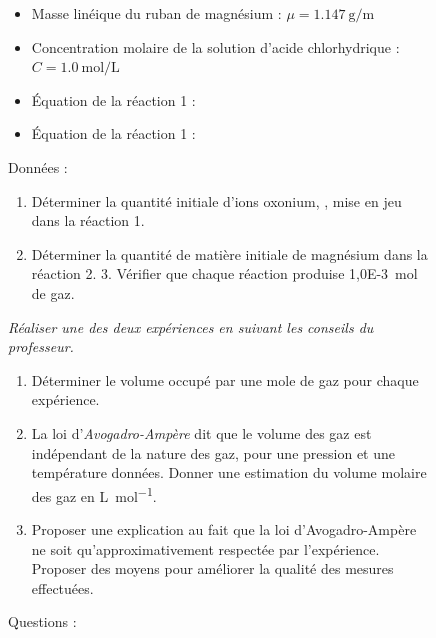 \documentclass[a4paper,12pt,fleqn]{article}%
\begin{document}
\begin{figure}[h!]
	\caption{Données :}
	\label{doc4}
	\begin{itemize}
		\item Masse linéique du ruban de magnésium : $\mu = \SI{1,147}{\gram\per\meter}$
		\item Concentration molaire de la solution d'acide chlorhydrique : $C=\SI{1,0}{\mole\per\liter}$
		\item Équation de la réaction 1 : 
		\item Équation de la réaction 1 : 
	\end{itemize}
\end{figure}

\begin{figure}[h!]
	\caption*{Questions :}
	\begin{enumerate}
		\item Déterminer la quantité initiale d'ions oxonium, , mise en jeu dans la réaction 1.
		\item Déterminer la quantité de matière initiale de magnésium dans la réaction 2.
		3. Vérifier que chaque réaction produise \SI{1,0E-3}{\mole} de gaz.
	\end{enumerate}
	\textit{Réaliser \emph{une des deux expériences} en suivant les conseils du professeur.}
	
	\begin{enumerate}[resume]
		\item Déterminer le volume occupé par une mole de gaz pour chaque expérience.
		\item La loi d'\textit{Avogadro-Ampère} dit que le volume des gaz est indépendant de la nature des gaz, pour une pression et une température données. Donner une estimation du volume molaire des gaz en \unit{\liter\per\mole}.
		\item Proposer une explication au fait que la loi d'Avogadro-Ampère ne soit qu’approximativement respectée par l'expérience. Proposer des moyens pour améliorer la qualité des mesures effectuées. 
	\end{enumerate}
\end{figure}

	
\end{document}
